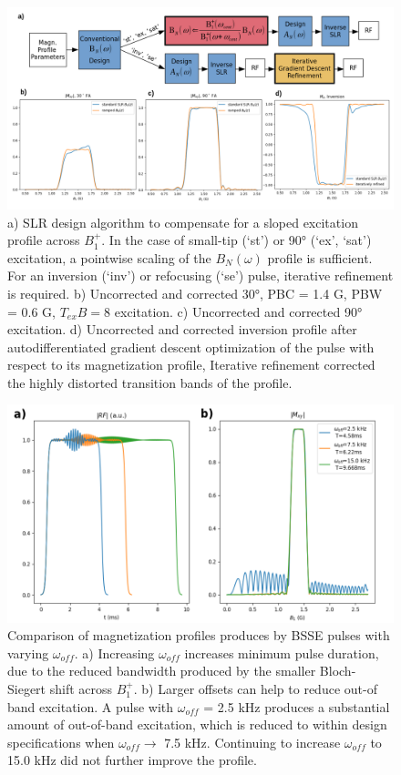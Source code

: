 \begin{figure}[h]
\centering
\includegraphics[width=1\textwidth]{figures/beta_filt_flowchart.png}
\caption{a) SLR design algorithm to compensate for a sloped excitation profile across $B_1^+$. In the case of small-tip (`st') or 90° (`ex', `sat') excitation, a
pointwise scaling of the $B_N (\omega)$ profile is sufficient. 
For an inversion (`inv') or refocusing (`se') pulse, iterative refinement is required. 
b) Uncorrected and corrected 30°, PBC = 1.4 G, PBW = 0.6 G, $T_{ex}B=8$ excitation.
c) Uncorrected and corrected 90° excitation. 
d) Uncorrected and corrected inversion profile after
autodifferentiated gradient descent optimization of the pulse with respect to its magnetization profile, Iterative refinement corrected the highly distorted transition bands of the profile.}
\label{fig:ramp}
\end{figure}

\begin{figure}[h]
\centering
\includegraphics[width=1\textwidth]{figures/bs_offset_comparison_processed.png}
\caption{Comparison of magnetization profiles produces by BSSE pulses with varying $\omega_{off}$. 
a) Increasing $\omega_{off}$ increases minimum pulse duration, 
due to the reduced bandwidth produced by the smaller Bloch-Siegert shift across $B_1^+$. 
b) Larger offsets can help to reduce out-of band excitation. 
A pulse with $\omega_{off}$ = 2.5 kHz produces a substantial amount of out-of-band excitation, 
which is reduced to within design specifications when $\omega_{off} \rightarrow$ 7.5 kHz. 
Continuing to increase $\omega_{off}$ to 15.0 kHz did not further improve the profile.}
\label{fig:bsse_offres_comp}
\end{figure}


